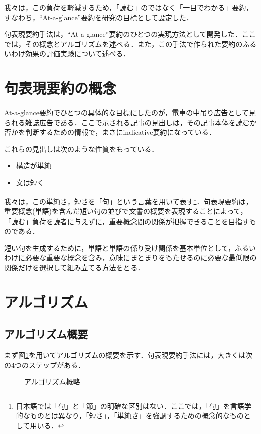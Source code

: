 我々は，この負荷を軽減するため，「読む」のではなく「一目でわかる」要約，すなわち，``At-a-glance''要約を研究の目標として設定した．

句表現要約手法は，``At-a-glance''要約のひとつの実現方法として開発した．ここでは，その概念とアルゴリズムを述べる．また，この手法で作られた要約のふるいわけ効果の評価実験について述べる．

\section{句表現要約の概念} \label{gainen}
At-a-glance要約でひとつの具体的な目標にしたのが，電車の中吊り広告として見られる雑誌広告である．ここで示される記事の見出しは，その記事本体を読むか否かを判断するための情報で，まさにindicative要約になっている．

これらの見出しは次のような性質をもっている．
\begin{itemize}
 \item 構造が単純
 \item 文は短く
\end{itemize}

\noindent
我々は，この単純さ，短さを「句」という言葉を用いて表す\footnote{日本語では「句」と「節」の明確な区別はない．ここでは，「句」を言語学的なものとは異なり，「短さ」，「単純さ」を強調するための概念的なものとして用いる．}．句表現要約は，重要概念(単語)を含んだ短い句の並びで文書の概要を表現することによって，「読む」負荷を読者に与えずに，重要概念間の関係が把握できることを目指すものである．

短い句を生成するために，単語と単語の係り受け関係を基本単位として，ふるいわけに必要な重要な概念を含み，意味にまとまりをもたせるのに必要な最低限の関係だけを選択して組み立てる方法をとる．


\section{アルゴリズム}
\subsection{アルゴリズム概要}

まず図\ref{algo}を用いてアルゴリズムの概要を示す．句表現要約手法には，大きくは次の4つのステップがある．

\begin{figure}[htbp]
  \begin{center}
    \caption{アルゴリズム概略}
    \label{algo}
  \end{center}
\end{figure}

